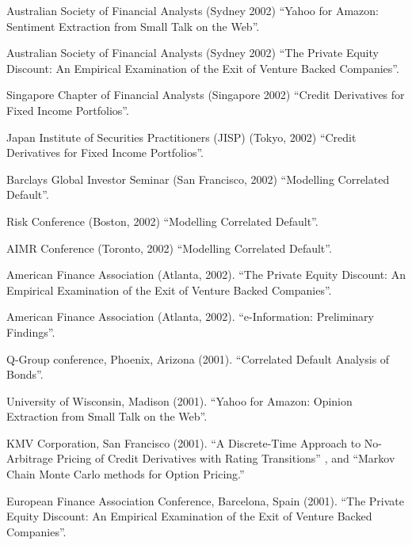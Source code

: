 \documentclass{article}
\begin{document}
\begin{etaremune}
{\item Australian Society of Financial Analysts (Sydney 2002)
``Yahoo for Amazon: Sentiment Extraction from Small Talk on the Web''. 

\item Australian Society of Financial Analysts (Sydney 2002)
``The Private Equity Discount: An Empirical Examination of the
Exit of Venture Backed Companies''.


\item Singapore Chapter of Financial Analysts (Singapore 2002)
``Credit Derivatives for Fixed Income Portfolios''.

\item Japan Institute of Securities Practitioners (JISP) (Tokyo, 2002)
``Credit Derivatives for Fixed Income Portfolios''.


\item Barclays Global Investor Seminar (San Francisco, 2002) 
``Modelling Correlated Default''.

\item Risk Conference (Boston, 2002) 
``Modelling Correlated Default''.

\item AIMR Conference (Toronto, 2002) 
``Modelling Correlated Default''.

\item American Finance Association (Atlanta, 2002).
``The Private Equity Discount: An Empirical Examination of the
Exit of Venture Backed Companies''.

\item American Finance Association (Atlanta, 2002).
``e-Information: Preliminary Findings''.

\item Q-Group conference, Phoenix, Arizona (2001). 
``Correlated Default Analysis of Bonds''.

\item University of Wisconsin, Madison (2001).
``Yahoo for Amazon: Opinion Extraction from Small Talk on the Web''. 

\item KMV Corporation, San Francisco (2001).
 ``A Discrete-Time Approach to No-Arbitrage Pricing of Credit
Derivatives with Rating Transitions'' , and  
``Markov Chain Monte Carlo methods for Option Pricing.''

\item European Finance Association Conference, Barcelona, Spain (2001).
``The Private Equity Discount: An Empirical Examination of the
Exit of Venture Backed Companies''.

}
\end{etaremune}
\end{document}
